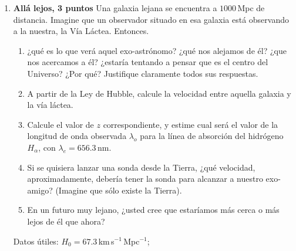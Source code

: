 \documentclass[a4paper,12pt]{article}
\begin{document}
\begin{enumerate}
	\item {\bf{Allá lejos, 3 puntos}}
		Una galaxia lejana se encuentra a $1000$\,Mpc de distancia. Imagine que
		un observador situado en esa galaxia está observando a la nuestra, la
		Vía Láctea. Entonces.
		\begin{enumerate}
			\item ¿qué es lo que verá aquel exo-astrónomo? ¿qué nos alejamos de
				él?  ¿que nos acercamos a él? ¿estaría tentando a pensar que es
				el centro del Universo? ¿Por qué? Justifique claramente todos
				sus respuestas.
			\item A partir de la Ley de Hubble, calcule la velocidad entre
				aquella galaxia y la vía láctea.
			\item Calcule el valor de $z$ correspondiente, y estime cual será
				el valor de la longitud de onda observada $\lambda_o$ para la
				línea de absorción del hidrógeno $H_\alpha$, con
				$\lambda_e = 656.3$\,nm.
			\item Si se quisiera lanzar una sonda desde la Tierra, ¿qué
				velocidad, aproximadamente, debería tener la sonda para
				alcanzar a nuestro exo-amigo? (Imagine que sólo existe la
				Tierra).
			\item En un futuro muy lejano, ¿usted cree que estaríamos más cerca
				o más lejos de él que ahora?
		\end{enumerate}
		Datos útiles: $H_0 = 67.3$\,km\,s$^{-1}$\,Mpc$^{-1}$;
\end{enumerate}
\end{document}
